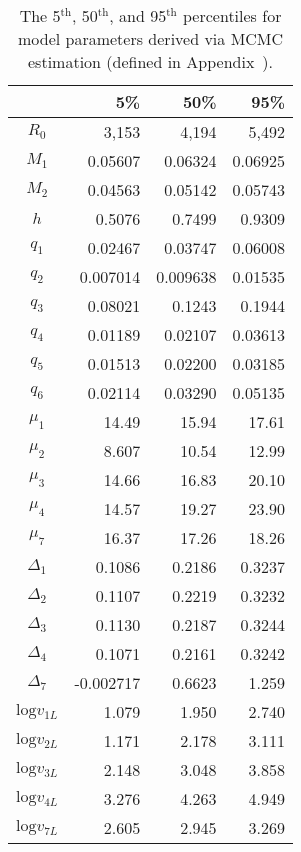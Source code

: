 \documentclass[11pt]{book}
\newcommand{\super}[1]{$^\mathrm{#1}$}
\begin{document}
\begin{table}[ht]
\centering
\caption{The 5\super{th}, 50\super{th}, and 95\super{th} percentiles for model parameters derived via MCMC estimation (defined in Appendix~\eqnchapter).} 
\label{tab:MCMCpar}
\begin{tabular}{crrr}
  \\[-1.0ex] \hline
 & 5\% & 50\% & 95\% \\ 
  \hline
$R_0$ & 3,153 & 4,194 & 5,492 \\ 
  $M_1$ & 0.05607 & 0.06324 & 0.06925 \\ 
  $M_2$ & 0.04563 & 0.05142 & 0.05743 \\ 
  $h$ & 0.5076 & 0.7499 & 0.9309 \\ 
  $q_1$ & 0.02467 & 0.03747 & 0.06008 \\ 
  $q_2$ & 0.007014 & 0.009638 & 0.01535 \\ 
  $q_3$ & 0.08021 & 0.1243 & 0.1944 \\ 
  $q_4$ & 0.01189 & 0.02107 & 0.03613 \\ 
  $q_5$ & 0.01513 & 0.02200 & 0.03185 \\ 
  $q_6$ & 0.02114 & 0.03290 & 0.05135 \\ 
  $\mu_1$ & 14.49 & 15.94 & 17.61 \\ 
  $\mu_2$ & 8.607 & 10.54 & 12.99 \\ 
  $\mu_3$ & 14.66 & 16.83 & 20.10 \\ 
  $\mu_4$ & 14.57 & 19.27 & 23.90 \\ 
  $\mu_7$ & 16.37 & 17.26 & 18.26 \\ 
  $\Delta_1$ & 0.1086 & 0.2186 & 0.3237 \\ 
  $\Delta_2$ & 0.1107 & 0.2219 & 0.3232 \\ 
  $\Delta_3$ & 0.1130 & 0.2187 & 0.3244 \\ 
  $\Delta_4$ & 0.1071 & 0.2161 & 0.3242 \\ 
  $\Delta_7$ & -0.002717 & 0.6623 & 1.259 \\ 
  $\mathrm{log} v_{1L}$ & 1.079 & 1.950 & 2.740 \\ 
  $\mathrm{log} v_{2L}$ & 1.171 & 2.178 & 3.111 \\ 
  $\mathrm{log} v_{3L}$ & 2.148 & 3.048 & 3.858 \\ 
  $\mathrm{log} v_{4L}$ & 3.276 & 4.263 & 4.949 \\ 
  $\mathrm{log} v_{7L}$ & 2.605 & 2.945 & 3.269 \\ 
   \hline
\end{tabular}
\end{table}
\clearpage
\end{document}

